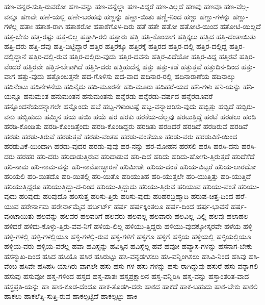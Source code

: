 {ಹಣ-ವನ್ನರ-ಸುತ್ತಿ-ರುವರೋ
ಹಣ-ವನ್ನು
ಹಣ-ವನ್ನೆಲ್ಲಾ
ಹಣ-ವಿದ್ದರೆ
ಹಣ-ವಿಲ್ಲದೆ
ಹಣವು
ಹಣವೂ
ಹಣ-ವೆಲ್ಲ-ವನ್ನೂ
ಹಣವೇ
ಹಣೆ-ಯಲ್ಲಿ
ಹಣೇ-ಬರಹವು
ಹಣ್ಣನ್ನು
ಹಣ್ಣಾ-ಯಿತು
ಹಣ್ಣಿ-ನಿಂದ
ಹಣ್ಣು
ಹಣ್ಣು-ಗಳನ್ನು
ಹಣ್ಣು-ಗಳೆಲ್ಲ
ಹತಾಃ
ಹತಾಶ-ರಾಗಿ
ಹತಾಶರೋ
ಹತಾಶೆಗೊಳ-ದಿರು
ಹತೆ
ಹತೇ
ಹತೋ
ಹತೋಟಿ-ಯಿಂದ
ಹತೋಟಿ-ಯಿಲ್ಲದೆ
ಹತ್ತ-ಬೇಕು
ಹತ್ತ-ರಷ್ಟು
ಹತ್ತ-ಲಿಲ್ಲ
ಹತ್ತಾಗಿ-ರಲಿ
ಹತ್ತಾರು
ಹತ್ತಿ
ಹತ್ತಿ-ಕೊಂಡಾಗ
ಹತ್ತಿಕ್ಕಲು
ಹತ್ತಿದ
ಹತ್ತಿ-ದಂತಾಯಿತು
ಹತ್ತಿ-ದರು
ಹತ್ತಿ-ದೆವು
ಹತ್ತಿ-ಬಿಟ್ಟಿದ್ದಾರೆ
ಹತ್ತಿರ
ಹತ್ತಿರಕ್ಕೂ
ಹತ್ತಿರಕ್ಕೆ
ಹತ್ತಿರದ
ಹತ್ತಿರ-ದಲ್ಲಿ
ಹತ್ತಿರ-ದಲ್ಲಿದ್ದ
ಹತ್ತಿರ-ದಲ್ಲಿದ್ದಾನೆ
ಹತ್ತಿರ-ದಲ್ಲಿ-ರುವ
ಹತ್ತಿರ-ದಲ್ಲಿರು-ವುದು
ಹತ್ತಿರ-ದವನು
ಹತ್ತಿರ-ವಿದೆಯೋ
ಹತ್ತಿರ-ವಿದ್ದ
ಹತ್ತಿರವೆ
ಹತ್ತಿರ-ವೆಂದರೆ
ಹತ್ತಿರವೇ
ಹತ್ತಿಸ-ಬೇಕಾಗಿದೆ
ಹತ್ತಿಸಿ-ದರು
ಹತ್ತಿಹುದೆನ್ನ
ಹತ್ತು
ಹತ್ತು-ಕಡೆ
ಹತ್ತುತ್ತವೆ
ಹತ್ತುದಿನ-ದಿಂದ
ಹತ್ತು-ವಾಗ
ಹತ್ತು-ವುದು
ಹತ್ತೊಂಬತ್ತನೇ
ಹದ-ಗೊಳಿಸು
ಹದ-ವಾದ
ಹದಿನಾರ-ರಲ್ಲಿ
ಹದಿನಾರಾಣೆಯ
ಹದಿನಾಲ್ಕು
ಹದಿನೆಂಟು
ಹದಿನೇಳನೆಯ
ಹದಿನೈದು
ಹದಿ-ಮೂರನೇ
ಹದಿ-ಮೂರು
ಹದಿಹರೆ-ಯದ
ಹನಿ-ಗಳು
ಹನಿ-ಯನ್ನು
ಹನಿ-ಯನ್ನೂ
ಹನುಮಂತ
ಹನುಮಂತನ
ಹನುಮಂತನು
ಹನ್ನೆರಡು
ಹನ್ನೆರಡು-ವರ್ಷದ
ಹನ್ನೆರಡೂವರೆ
ಹನ್ನೊಂದನೆಯದನ್ನಾಗಲೇ
ಹನ್ನೊಂದು
ಹಬೆ
ಹಬ್ಬ-ಗಳುಂಟಷ್ಟೆ
ಹಬ್ಬ-ವನ್ನಾಚರಿಸು-ವುದು
ಹಬ್ಬಿತ್ತು
ಹಬ್ಬಿದೆ
ಹಬ್ಬಿರು-ವನು
ಹಬ್ಬಿಹುದು
ಹಮ್ಮಿನ
ಹಯ
ಹಯಿ
ಹಯೆ
ಹರ
ಹರಕು
ಹರಕೆಯ-ದೆಲ್ಲವು
ಹರಟುತ್ತಿದ್ದೆ
ಹರಟೆ
ಹರಡಲು
ಹರಡಿ
ಹರಡಿ-ಕೊಂಡಿತು
ಹರಡಿ-ಕೊಂಡಿತ್ತೆಂದು
ಹರಡಿ-ಕೊಂಡಿದ್ದರು
ಹರಡಿತು
ಹರಡಿದರೆ
ಹರಡಿದೆ
ಹರಡಿರುವೆ
ಹರಡಿವೆ
ಹರಡು
ಹರಡು-ತಿರುವೆ
ಹರಡುತ್ತವೆ
ಹರಡು-ವಂತಹ
ಹರಡು-ವಂತೆಯೂ
ಹರಡು-ವರು
ಹರಡುವಿಕೆ-ಯಿಂದ
ಹರಡುವಿಕೆ-ಯಿಂದಾಗಿ
ಹರಡು-ವುದರ
ಹರಡು-ವುವು
ಹರ-ನನ್ನು
ಹರ-ಮೋಹನ
ಹರಸಲಿ
ಹರಸಿ
ಹರಸಿ-ದನು
ಹರಸಿ-ದರು
ಹರಹರ
ಹರಿ-ದರು
ಹರಿದಾಡುತ್ತಿರುವ
ಹರಿದಾಡುವ
ಹರಿ-ದಿದೆ
ಹರಿದು
ಹರಿದು-ಹೋಗು-ತ್ತಿರುತ್ತದೆ
ಹರಿದೆಸೆದೆ
ಹರಿ-ನಾಮ
ಹರಿ-ನಾಮ-ವನ್ನು
ಹರಿ-ನಾಮೋಚ್ಛಾರಣೆ
ಹರಿಮೀಡೇ
ಹರಿಯ-ದಂತೆ
ಹರಿಯ-ಬಿಟ್ಟರೆ
ಹರಿಯ-ಲಾರದೋ
ಹರಿಯಲಿ
ಹರಿ-ಯಿತದೊ
ಹರಿ-ಯಿತಲ್ಲಿ
ಹರಿ-ಯಿತೊ
ಹರಿಯುತಿಹ
ಹರಿ-ಯುತ್ತಲೇ
ಹರಿ-ಯುತ್ತಿತ್ತು
ಹರಿ-ಯುತ್ತಿದೆ
ಹರಿಯುತ್ತಿದ್ದರೂ
ಹರಿಯುತ್ತಿದ್ದು-ದ-ರಿಂದ
ಹರಿಯು-ತ್ತಿದ್ದುದು
ಹರಿಯು-ತ್ತಿರುವ
ಹರಿಯುವ
ಹರಿಯು-ವಂತೆ
ಹರಿಯು-ವುದು
ಹರಿವುದು
ಹರಿವುದೊ
ಹರಿಸುತ್ತ
ಹರಿಸು-ತ್ತಿರು
ಹರಿಸು-ವುದು
ಹರಿಹರಬ್ರಹ್ಮಾದಿ
ಹರುಷ-ಚಿತ್ತ-ದಿಂದ
ಹರೆ-ಯುವ
ಹರೇರ್ನಾಮ
ಹರೇರ್ನಾಮೈವ
ಹರ್ಬರ್ಟ್
ಹರ್ಷ
ಹರ್ಷಕ್ಕಿಂತಲೂ
ಹರ್ಷ-ದಿಂದ
ಹರ್ಷ-ಭಾವನೆ
ಹರ್ಷ-ವುಂಟಾಯಿತು
ಹಲವನ್ನು
ಹಲವರ
ಹಲವರಿಗೆ
ಹಲವರು
ಹಲವಲ್ಲ
ಹಲವಾರು
ಹಲವಿಲ್ಲ-ವಿಲ್ಲಿ
ಹಲವು
ಹಲಾಹಲ
ಹಳಿದರೆ
ಹಳಿದು-ಕೊಳ್ಳು-ತ್ತಿರು-ವವ-ನಿಗೆ
ಹಳಿಯ-ಲಿಲ್ಲ
ಹಳಿಯು-ತ್ತಿದ್ದರು
ಹಳಿಯು-ವುದಕ್ಕೋಸ್ಕರವೇ
ಹಳೆಯ
ಹಳ್ಳಿ
ಹಳ್ಳಿ-ಗಳಲ್ಲಿ
ಹಳ್ಳಿ-ಗಳಲ್ಲಿಯೂ
ಹಳ್ಳಿ-ಗಳಲ್ಲಿ-ರುವ
ಹಳ್ಳಿ-ಗಳಿಗೆ
ಹಳ್ಳಿಗೂ
ಹಳ್ಳಿಗೆ
ಹಳ್ಳಿಯ
ಹಳ್ಳಿಯಲ್ಲಿ
ಹಳ್ಳಿಯಲ್ಲಿಯೂ
ಹಳ್ಳಿಯ-ವರು
ಹಳ್ಳಿಯ-ವರೆಲ್ಲ
ಹವಾ
ಹವಿಸ್ಸನ್ನು
ಹವಿಸ್ಸಿನ
ಹವಿಸ್ಸೆಲ್ಲ
ಹವೆ
ಹವೋ
ಹವ್ಯಾಸ-ಗಳನ್ನು
ಹಸನಾಗ-ಬೇಕು
ಹಸನ್ಮುಖ-ದಿಂದ
ಹಸಿದ
ಹಸಿಯೊ
ಹಸಿರ
ಹಸಿರುಟ್ಟು
ಹಸಿ-ವನ್ನಡಗಿಸಲು
ಹಸಿ-ವನ್ನಿಂಗಿಸಲು
ಹಸಿವಿ-ನಿಂದ
ಹಸಿವು
ಹಸಿ-ವೆಂಬ
ಹಸಿವೇ
ಹಸಿಹಸಿ-ಯಾಗಿರು-ವಾಗಲೇ
ಹಸು
ಹಸು-ಗಳ
ಹಸು-ಗಳನ್ನು
ಹಸು-ರಾಗಿದ್ದುವು
ಹಸುರೆ
ಹಸು-ವನ್ನಾಗಲಿ
ಹಸುವು
ಹಸುವೋ
ಹಸ್ತ-ಗಳಿಂದ
ಹಸ್ತದ
ಹಸ್ತ-ಪಾತಃ
ಹಸ್ತಪ್ರಕ್ಷಾಲನ
ಹಸ್ತ-ವನ್ನಿರಿಸಿ
ಹಸ್ತ-ವನ್ನು
ಹಸ್ತಾಂತರಿತ-ವಾದ
ಹಸ್ಥಪ್ರತಿ-ಯನ್ನು
ಹಾ
ಹಾಕ-ಕೂಡ-ದೆಂದೂ
ಹಾಕ-ತೊಡಗಿ-ದರು
ಹಾಕದ
ಹಾಕದೆ
ಹಾಕ-ಬಹುದು
ಹಾಕ-ಬೇಕು
ಹಾಕಲಿ
ಹಾಕಲು
ಹಾಕಲೆತ್ನಿ-ಸುತ್ತಿ-ರುವ
ಹಾಕಲ್ಪಟ್ಟಿದೆ
ಹಾಕಲ್ಪಟ್ಟು
ಹಾಕಿ
}
